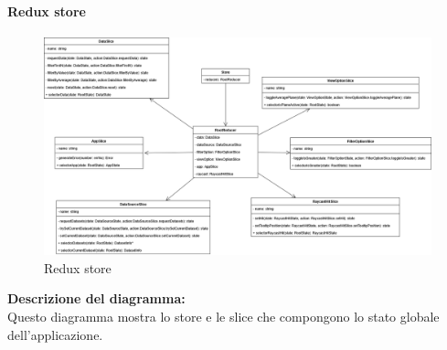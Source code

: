\paragraph{Redux store}
\begin{figure}[h!] \centering
      \includegraphics[scale=0.35]{template/images/uml_front/logic/Store.png}
      \caption{Redux store}
\end{figure}
\textbf{Descrizione del diagramma:}\\
Questo diagramma mostra lo store e le slice che compongono lo stato globale dell'applicazione.
